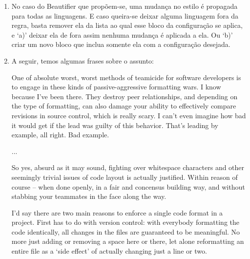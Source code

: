 \begin{englishtext}
\begin{enumerate}[leftmargin=*]
        \item

        No caso do Beautifier que propõem-se, uma mudança no estilo é propagada para todas as
        linguagens. E caso queira-se deixar alguma linguagem fora da regra, basta remover ela da
        lista ao qual esse bloco da configuração se aplica, e `a)' deixar ela de fora assim nenhuma
        mudança é aplicada a ela. Ou `b)' criar um novo bloco que inclua somente ela com a
        configuração desejada.

        \item

        A seguir, temos algumas frases sobre o assunto:

        \begin{citacao}
        One of absolute worst, worst methods of teamicide for software developers is to engage
        in these kinds of passive-aggressive formatting wars. I know because I've been there.
        They destroy peer relationships, and depending on the type of formatting, can also damage
        your ability to effectively compare revisions in source control, which is really scary.
        I can't even imagine how bad it would get if the lead was guilty of this behavior. That's
        leading by example, all right. Bad example. \cite{Atwood}
        \end{citacao}
        \vspace{-5mm}
        ...
        \begin{citacao}
        So yes, absurd as it may sound, fighting over whitespace characters and other seemingly
        trivial issues of code layout is actually justified. Within reason of course -- when done
        openly, in a fair and concensus building way, and without stabbing your teammates in the
        face along the way. \cite{Atwood}
        \end{citacao}

        \begin{citacao}
        I'd say there are two main reasons to enforce a single code format in a project. First has
        to do with version control: with everybody formatting the code identically, all changes in
        the files are guaranteed to be meaningful. No more just adding or removing a space here or
        there, let alone reformatting an entire file as a `side effect' of actually changing just a
        line or two. \cite{Geukens}
        \end{citacao}


\end{enumerate}
\end{englishtext}
